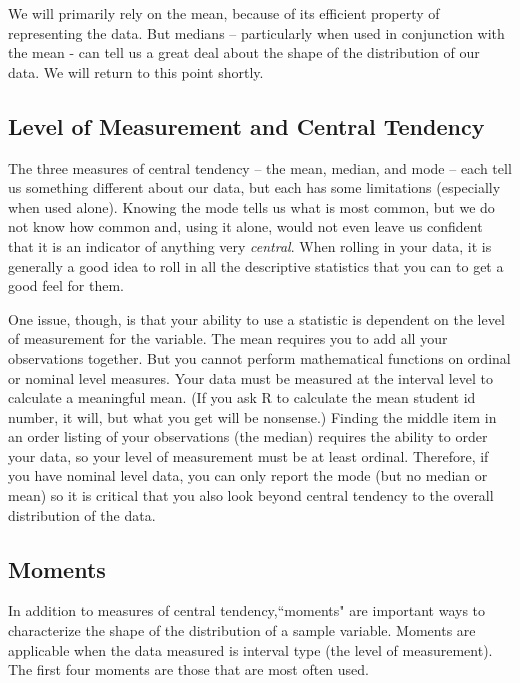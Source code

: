 \documentclass[11pt,openany]{book}\usepackage[]{graphicx}\usepackage[]{color}
\begin{document}
We will primarily rely on the mean, because of its efficient property of representing the data. But medians -- particularly when used in conjunction with the mean - can tell us a great deal about the shape of the distribution of our data. We will return to this point shortly.

\subsection{Level of Measurement and Central Tendency}

The three measures of central tendency --  the mean, median, and mode -- each tell us something different about our data, but each has some limitations (especially when used alone). Knowing the mode tells us what is most common, but we do not know how common and, using it alone, would not even leave us confident that it is an indicator of anything very \textit{central}. When rolling in your data, it is generally a good idea to roll in all the descriptive  statistics that you can to get a good feel for them.

One issue, though, is that your ability to use a statistic is dependent on the level of measurement for the variable.  The mean requires you to add all your observations together. But you cannot perform mathematical functions on ordinal or nominal level measures. Your data must be measured at the interval level to calculate a meaningful mean. (If you ask R to calculate the mean student id number, it will, but what you get will be nonsense.) Finding the middle item in an order listing of your observations (the median) requires the ability to order your data, so your level of measurement must be at least ordinal. Therefore, if you have nominal level data, you can only report the mode (but no median or mean) so it is critical that you also look beyond central tendency to the overall distribution of the data.

\subsection{Moments} 

In addition to measures of central tendency,``moments" are important ways to characterize the shape of the distribution of a sample variable. Moments are applicable when the data measured is interval type (the level of measurement). The first four moments are those that are most often used.  
\end{document}
